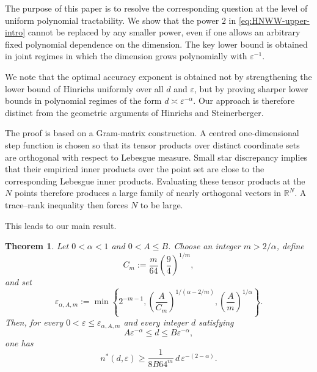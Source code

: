 \documentclass[11pt]{article}
\theoremstyle{plain}
\newtheorem{theorem}{Theorem}[section]
\theoremstyle{remark}
\theoremstyle{definition}
\newcommand{\1}{\mathbf{1}}
\newcommand{\R}{\mathbb{R}}
\begin{document}
The purpose of this paper is to resolve the corresponding question at the level of uniform polynomial tractability.  We show that the power \(2\) in \eqref{eq:HNWW-upper-intro} cannot be replaced by any smaller power, even if one allows an arbitrary fixed polynomial dependence on the dimension.  The key lower bound is obtained in joint regimes in which the dimension grows polynomially with \(\varepsilon^{-1}\).

We note that the optimal accuracy exponent is obtained not by strengthening the lower bound of Hinrichs uniformly over all $d$ and $\varepsilon$, but by proving sharper lower bounds in polynomial regimes of the form $d\asymp\varepsilon^{-\alpha}$. Our approach is therefore distinct from the geometric arguments of Hinrichs and Steinerberger.

The proof is based on a Gram-matrix construction.  A centred one-dimensional step function is chosen so that its tensor products over distinct coordinate sets are orthogonal with respect to Lebesgue measure.  Small star discrepancy implies that their empirical inner products over the point set are close to the corresponding Lebesgue inner products.  Evaluating these tensor products at the \(N\) points therefore produces a large family of nearly orthogonal vectors in \(\R^N\).  A trace--rank inequality then forces \(N\) to be large.  


This leads to our main result.

\begin{theorem}\label{thm:main-strip}
Let \(0<\alpha<1\) and \(0<A\le B\).  Choose an integer \(m>2/\alpha\), define
\begin{equation}\label{eq:intro-Cm}
 C_m:=\frac m{64}\left(\frac94\right)^{1/m},
\end{equation}
and set
\begin{equation}\label{eq:intro-epsilon-alpha}
 \varepsilon_{\alpha,A,m}
 :=
 \min\left\{
 2^{-m-1},
 \left(\frac A{C_m}\right)^{1/(\alpha-2/m)},
 \left(\frac A m\right)^{1/\alpha}
 \right\}.
\end{equation}
Then, for every \(0<\varepsilon\le\varepsilon_{\alpha,A,m}\) and every integer \(d\) satisfying
\begin{equation}\label{eq:intro-alpha-strip}
 A\varepsilon^{-\alpha}\le d\le B\varepsilon^{-\alpha},
\end{equation}
one has
\begin{equation*}
 n^{\ast}(d,\varepsilon)
 \ge
 \frac1{8B64^m}\,
 d\,\varepsilon^{-(2-\alpha)}.
\end{equation*}
\end{theorem}
\end{document}
